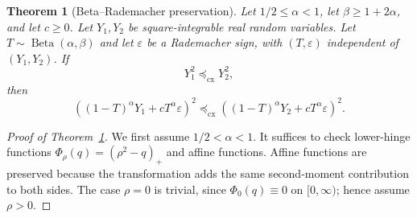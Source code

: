 \documentclass[10pt,a4paper]{amsart}
\newtheorem{theorem}{Theorem}
\newcommand{\cx}{\preceq_{\mathrm{cx}}}
\newcommand{\eps}{\varepsilon}
\begin{document}
\begin{theorem}[Beta--Rademacher preservation]\label{thm:app-append}
Let $1/2\le\alpha<1$, let $\beta\ge1+2\alpha$, and let $c\ge0$. Let
$Y_1,Y_2$ be square-integrable real random variables. Let
$T\sim\operatorname{Beta}(\alpha,\beta)$ and let $\eps$ be a Rademacher
sign, with $(T,\eps)$ independent of $(Y_1,Y_2)$. If
\[
 Y_1^2\cx Y_2^2,
\]
then
\[
 \left((1-T)^\alpha Y_1+cT^\alpha\eps\right)^2
 \cx
 \left((1-T)^\alpha Y_2+cT^\alpha\eps\right)^2.
\]
\end{theorem}

\begin{proof}[Proof of Theorem~\ref{thm:app-append}]
We first assume $1/2<\alpha<1$. It suffices to check lower-hinge functions $\Phi_\rho(q)=(\rho^2-q)_+$ and affine functions. Affine functions are preserved because the transformation adds the same second-moment contribution to both sides. The case $\rho=0$ is trivial, since $\Phi_0(q)\equiv0$ on $[0,\infty)$; hence assume $\rho>0$.


\end{proof}
\end{document}
